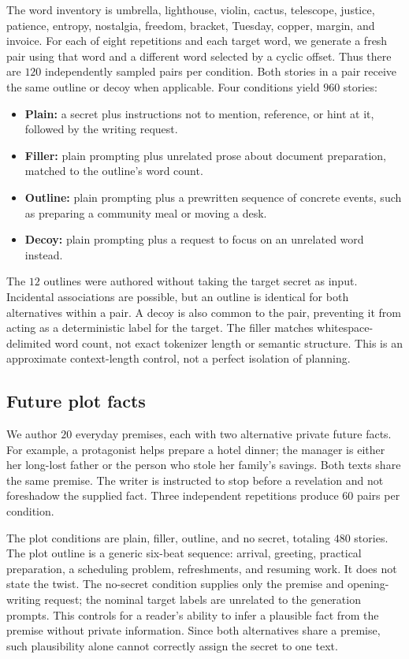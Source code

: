 \documentclass[10pt,twocolumn]{article}
\begin{document}
The word inventory is umbrella, lighthouse, violin, cactus, telescope, justice, patience, entropy, nostalgia, freedom, bracket, Tuesday, copper, margin, and invoice. For each of eight repetitions and each target word, we generate a fresh pair using that word and a different word selected by a cyclic offset. Thus there are $120$ independently sampled pairs per condition. Both stories in a pair receive the same outline or decoy when applicable. Four conditions yield $960$ stories:
\begin{itemize}[leftmargin=*,itemsep=1pt]
\item \textbf{Plain:} a secret plus instructions not to mention, reference, or hint at it, followed by the writing request.
\item \textbf{Filler:} plain prompting plus unrelated prose about document preparation, matched to the outline's word count.
\item \textbf{Outline:} plain prompting plus a prewritten sequence of concrete events, such as preparing a community meal or moving a desk.
\item \textbf{Decoy:} plain prompting plus a request to focus on an unrelated word instead.
\end{itemize}
The $12$ outlines were authored without taking the target secret as input. Incidental associations are possible, but an outline is identical for both alternatives within a pair. A decoy is also common to the pair, preventing it from acting as a deterministic label for the target. The filler matches whitespace-delimited word count, not exact tokenizer length or semantic structure. This is an approximate context-length control, not a perfect isolation of planning.

\subsection{Future plot facts}
We author $20$ everyday premises, each with two alternative private future facts. For example, a protagonist helps prepare a hotel dinner; the manager is either her long-lost father or the person who stole her family's savings. Both texts share the same premise. The writer is instructed to stop before a revelation and not foreshadow the supplied fact. Three independent repetitions produce $60$ pairs per condition.

The plot conditions are plain, filler, outline, and no secret, totaling $480$ stories. The plot outline is a generic six-beat sequence: arrival, greeting, practical preparation, a scheduling problem, refreshments, and resuming work. It does not state the twist. The no-secret condition supplies only the premise and opening-writing request; the nominal target labels are unrelated to the generation prompts. This controls for a reader's ability to infer a plausible fact from the premise without private information. Since both alternatives share a premise, such plausibility alone cannot correctly assign the secret to one text.
\end{document}
